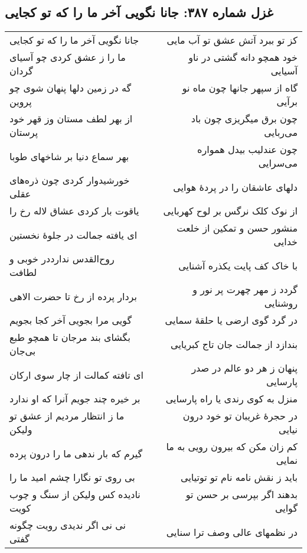 \begin{center}
\section*{غزل شماره ۳۸۷: جانا نگویی آخر ما را که تو کجایی}
\label{sec:387}
\begin{longtable}{l p{0.5cm} r}
جانا نگویی آخر ما را که تو کجایی
&&
کز تو ببرد آتش عشق تو آب مایی
\\
ما را ز عشق کردی چو آسیای گردان
&&
خود همچو دانه گشتی در ناو آسیایی
\\
گه در زمین دلها پنهان شوی چو پروین
&&
گاه از سپهر جانها چون ماه نو برآیی
\\
از بهر لطف مستان وز قهر خود پرستان
&&
چون برق میگریزی چون باد می‌ربایی
\\
بهر سماع دنیا بر شاخهای طوبا
&&
چون عندلیب بیدل همواره می‌سرایی
\\
خورشیدوار کردی چون ذره‌های عقلی
&&
دلهای عاشقان را در پردهٔ هوایی
\\
یاقوت بار کردی عشاق لاله رخ را
&&
از نوک کلک نرگس بر لوح کهربایی
\\
ای یافته جمالت در جلوهٔ نخستین
&&
منشور حسن و تمکین از خلعت خدایی
\\
روح‌القدس ندارددر خوبی و لطافت
&&
با خاک کف پایت یکذره آشنایی
\\
بردار پرده از رخ تا حضرت الاهی
&&
گردد ز مهر چهرت پر نور و روشنایی
\\
گویی مرا بجویی آخر کجا بجویم
&&
در گرد گوی ارضی یا حلقهٔ سمایی
\\
بگشای بند مرجان تا همچو طبع بی‌جان
&&
بندازد از جمالت جان تاج کبریایی
\\
ای تافته کمالت از چار سوی ارکان
&&
پنهان ز هر دو عالم در صدر پارسایی
\\
بر خیره چند جویم آنرا که او ندارد
&&
منزل به کوی رندی یا راه پارسایی
\\
ما ز انتظار مردیم از عشق تو ولیکن
&&
در حجرهٔ غریبان تو خود درون نیایی
\\
گیرم که بار ندهی ما را درون پرده
&&
کم زان مکن که بیرون رویی به ما نمایی
\\
بی روی تو نگارا چشم امید ما را
&&
باید ز نقش نامه نام تو توتیایی
\\
نادیده کس ولیکن از سنگ و چوب کویت
&&
بدهند اگر بپرسی بر حسن تو گوایی
\\
نی نی اگر ندیدی رویت چگونه گفتی
&&
در نظمهای عالی وصف ترا سنایی
\\
\end{longtable}
\end{center}
